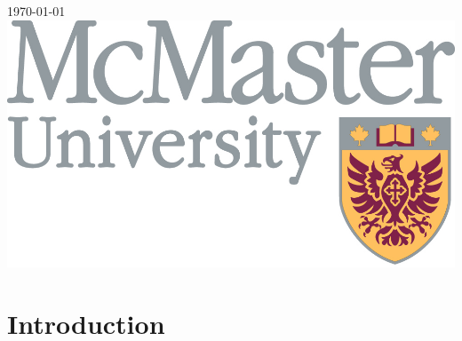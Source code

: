 \begin{titlepage}


{\large \today}\\[2cm] %


\includegraphics{McMasterfull_colour.jpg}\\[1cm] %


\vfill %

\end{titlepage}





\section{Introduction}

